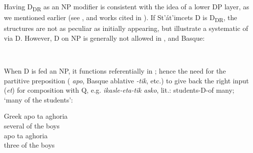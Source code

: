 \documentclass[output=paper,
modfonts
]{langscibook}
\begin{document}
\z 

Having D\textsubscript{DR} as an NP modifier is consistent with the idea of a lower DP layer, as we mentioned earlier (see \citealt{szabolcsi1987,szabolcsi2010}, and works cited in \citealt{AlexiadouEtAlii2008}). If St'\'at'imcets D is D\textsubscript{DR}, the  structures are not as peculiar as initially appearing, but illustrate a systematic  of  via D. However, D on NP is generally not allowed in ,  and Basque:

\ea\label{ex:etxeberria:38}
	\z
\z

\ea\label{ex:etxeberria:39}  \\
\z
\z

When D is fed an NP, it functions referentially in ; hence the need for the partitive preposition ( \textit{apo}, Basque ablative \textit{-tik}, etc.) to give back the right input (\textit{et}) for composition with Q, e.g. \textit{ikasle-eta-tik asko}, lit.: students-D-of many; `many of the students':

\ea\label{ex:etxeberria:40}
Greek 
\ea 
{} {apo} {ta} {aghoria} \\
several of the boys\\
\ex
{} {apo} {ta} {aghoria}\\
three of the boys\\
\z
\z
\end{document}
